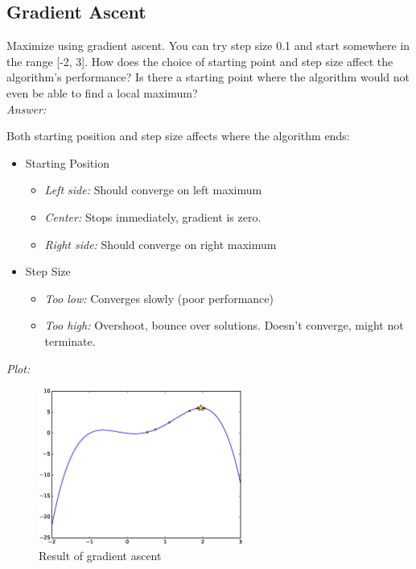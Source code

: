 \documentclass{article}           %
\newcommand\marginsymbol[1][0pt]{%
  \tabto*{0cm}\makebox[\dimexpr-1cm-#1\relax][r]{$\mathbb{P}$}\tabto*{\TabPrevPos}}
\begin{document}
\subsection{Gradient Ascent \marginsymbol}
\label{subsec:grada}
Maximize using gradient ascent. You can try step size 0.1 and start somewhere
in the range [-2, 3]. How does the choice of starting point and step size
affect the algorithm's performance? Is there a starting point where the
algorithm would not even be able to find a local maximum?\\

\emph{Answer:}

Both starting position and step size affects where the algorithm ends:
\begin{itemize}
    \item Starting Position
    \begin{itemize}
        \item \emph{Left side:} Should converge on left maximum
        \item \emph{Center:} Stops immediately, gradient is zero.
        \item \emph{Right side:} Should converge on right maximum
    \end{itemize}
    \item Step Size
    \begin{itemize}
        \item \emph{Too low:} Converges slowly (poor performance)
        \item \emph{Too high:} Overshoot, bounce over solutions. Doesn't converge, might not terminate.
    \end{itemize}
\end{itemize}

\emph{Plot:}
\begin{figure}[H]
\begin{center}
\includegraphics[width=0.6\textwidth]{eps/w1e1c.eps}
\caption{Result of gradient ascent}
\label{fig:w1e1c}
\end{center}
\end{figure}
\end{document}
